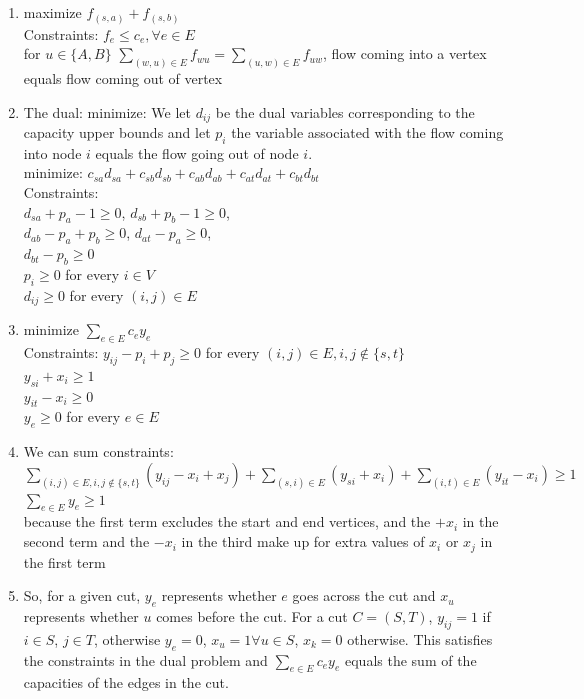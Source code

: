 \documentclass[11pt]{article}
\begin{document}
\begin{enumerate}
\begin{enumerate}
\item maximize $f_{(s,a)}+f_{(s,b)}$\\
Constraints: $f_{e}\le c_{e}, \forall e\in E$\\
for $u\in \{A,B\}$ $\sum_{(w,u)\in E}f_{wu}=\sum_{(u,w)\in E}f_{uw}$,  flow coming into a vertex equals flow coming out of vertex
\item The dual:
minimize: 
We let $d_{ij}$ be the dual variables corresponding to the capacity upper bounds and let $p_i$ the variable associated with the flow coming into node $i$ equals the flow going out of node $i$.\\
minimize: $c_{sa}d_{sa}+c_{sb}d_{sb}+c_{ab}d_{ab}+c_{at}d_{at}+c_{bt}d_{bt}$\\
Constraints:\\ 
$d_{sa}+p_a-1\ge 0$, $d_{sb}+p_b-1\ge 0$, \\
$d_{ab}-p_a+p_b\ge 0$, $d_{at}-p_a\ge 0$, \\
$d_{bt}-p_b\ge 0$\\
$p_i \ge 0$ for every $i\in V$\\
$d_{ij}\ge 0$ for every $(i,j)\in E$\\
\item 
minimize $\sum_{e\in E}c_{e}y_{e}$\\
Constraints: $y_{ij}-p_i+p_j\ge 0$ for every $(i,j)\in E, i,j\notin \{s,t\}$\\
$y_{si}+x_i\ge 1$\\
$y_{it}-x_i\ge 0$\\
$y_{e}\ge 0$ for every $e\in E$\\
\item We can sum constraints:\\
$\sum_{(i,j)\in E, i,j\notin \{s,t\}}(y_{ij}-x_i+x_j) + \sum_{(s,i)\in E}(y_{si}+x_i) + \sum_{(i,t)\in E}(y_{it}-x_i)\ge 1$\\
$\sum_{e\in E}y_e\ge 1$ \\
because the first term excludes the start and end vertices, and the $+x_i$ in the second term and the $-x_i$ in the third make up for extra values of $x_i$ or $x_j$ in the first term
\item So, for a given cut, $y_e$ represents whether $e$ goes across the cut and $x_u$ represents whether $u$ comes before the cut. For a cut $C=(S,T)$, $y_{ij}=1$ if $i\in S$, $j\in T$, otherwise $y_e=0$, $x_u=1 \forall u\in S$, $x_k=0$ otherwise. This satisfies the constraints in the dual problem and $\sum_{e\in E}c_ey_e$ equals the sum of the capacities of the edges in the cut.

\end{enumerate}
\end{enumerate}
\end{document}
